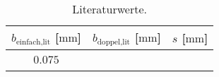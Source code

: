 \begin{table}
    \centering
    \caption{Literaturwerte.}
    \label{tab:lit}
    \begin{tabular}{c c c}
        \toprule
        $b_{\text{einfach,lit}}$ [$\si{\mm}$]  & $b_{\text{doppel,lit}}$ [$\si{\mm}$] & $s$ [$\si{\mm}$] \\
        \midrule
        $0.075$ & ~ & ~\\
       \bottomrule
    \end{tabular}
\end{table}          
          
          
          
          
          
